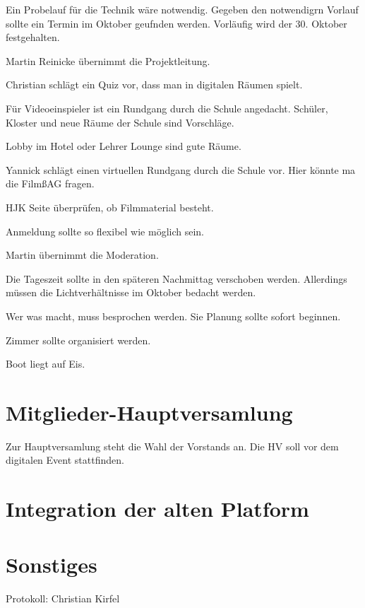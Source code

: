 \documentclass[a4paper, 11pt]{article}
\newcommand\signature[2]{%
\noindent\begin{minipage}{5cm}
    \noindent\vspace{3cm}\par
    \noindent\rule{5cm}{1pt}\par
    \noindent\textbf{#1}\par
    \noindent#2%
\end{minipage}}
\begin{document}
Ein Probelauf für die Technik wäre notwendig.
Gegeben den notwendigrn Vorlauf sollte ein Termin im Oktober geufnden werden.
Vorläufig wird der 30. Oktober festgehalten.

Martin Reinicke übernimmt die Projektleitung.

Christian schlägt ein Quiz vor, dass man in digitalen Räumen spielt.

Für Videoeinspieler ist ein Rundgang durch die Schule angedacht.
Schüler, Kloster und neue Räume der Schule sind Vorschläge.

Lobby im Hotel oder Lehrer Lounge sind gute Räume.

Yannick schlägt einen virtuellen Rundgang durch die Schule vor. Hier könnte ma die FilmßAG fragen.

HJK Seite überprüfen, ob Filmmaterial besteht.

Anmeldung sollte so flexibel wie möglich sein.

Martin übernimmt die Moderation.

Die Tageszeit sollte in den späteren Nachmittag verschoben werden.
Allerdings müssen die Lichtverhältnisse im Oktober bedacht werden.

Wer was macht, muss besprochen werden. Sie Planung sollte sofort beginnen.

Zimmer sollte organisiert werden.

Boot liegt auf Eis.

\section*{Mitglieder-Hauptversamlung}

Zur Hauptversamlung steht die Wahl der Vorstands an.
Die HV soll vor dem digitalen Event stattfinden.

\section*{Integration der alten Platform}

\section*{Sonstiges}




\newpage

Protokoll: Christian Kirfel


\end{document}
